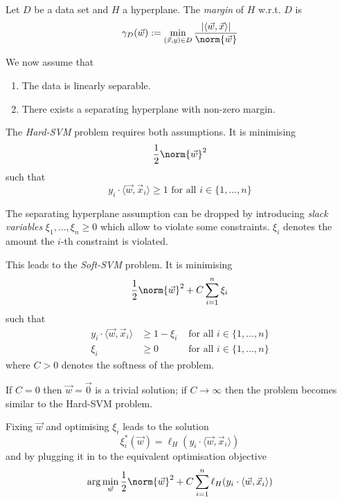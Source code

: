 Let $D$ be a data set and $H$ a hyperplane.
The \emph{margin} of $H$ w.r.t. $D$ is
\begin{equation*}
    \gamma_D(\vec{w}) := \min_{(\vec{x}, y) \in D}{
        \frac{|\langle \vec{w}, \vec{x} \rangle |}{\norm{\vec{w}}}
    }
\end{equation*}

We now assume that
\begin{enumerate}
    \item The data is linearly separable.
    \item There exists a separating hyperplane with non-zero margin.
\end{enumerate}

The \emph{Hard-SVM} problem requires both assumptions.
It is minimising
\begin{equation*}
    \frac{1}{2} \norm{\vec{w}}^2
\end{equation*}
such that
\begin{equation*}
    y_i \cdot \langle \vec{w}, \vec{x}_i \rangle
    \geq 1 \text{ for all $i \in \{1, \dotsc, n\}$}
\end{equation*}

The separating hyperplane assumption can be
dropped by introducing \emph{slack variables}
$\xi_1, \dotsc, \xi_n \geq 0$
which allow to violate some constraints.
$\xi_i$ denotes the amount the
$i$-th constraint is violated.

This leads to the \emph{Soft-SVM} problem.
It is minimising
\begin{equation*}
    \frac{1}{2} \norm{\vec{w}}^2 + C \sum_{i=1}^n{\xi_i}
\end{equation*}
such that
\begin{align*}
    y_i \cdot \langle \vec{w}, \vec{x}_i \rangle
        &\geq 1 - \xi_i & \text{ for all $i \in \{1, \dotsc, n\}$} \\
    \xi_i &\geq 0 & \text{ for all $i \in \{1, \dotsc, n\}$}
\end{align*}
where $C > 0$ denotes the softness of the problem.

If $C = 0$ then $\vec{w} = \vec{0}$ is a trivial
solution; if $C \to \infty$ then the problem
becomes similar to the Hard-SVM problem.

Fixing $\vec{w}$ and optimising $\xi_i$
leads to the solution
\begin{equation*}
    \xi_i^*(\vec{w}) = \ell_H(y_i \cdot \langle \vec{w}, \vec{x}_i \rangle)
\end{equation*}
and by plugging it in to the equivalent
optimisation objective
\begin{equation*}
    \arg\min_{\vec{w}}{
        \frac{1}{2} \norm{\vec{w}}^2
        + C \sum_{i=1}^n{\ell_H(y_i \cdot \langle \vec{w}, \vec{x}_i \rangle)}
    }
\end{equation*}


